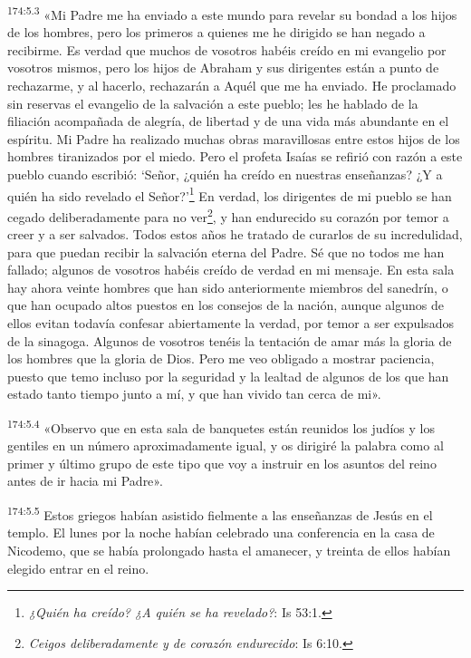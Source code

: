 \par
\textsuperscript{174:5.3} «Mi Padre me ha enviado a este mundo para revelar su bondad a los hijos de los hombres, pero los primeros a quienes me he dirigido se han negado a recibirme. Es verdad que muchos de vosotros habéis creído en mi evangelio por vosotros mismos, pero los hijos de Abraham y sus dirigentes están a punto de rechazarme, y al hacerlo, rechazarán a Aquél que me ha enviado. He proclamado sin reservas el evangelio de la salvación a este pueblo; les he hablado de la filiación acompañada de alegría, de libertad y de una vida más abundante en el espíritu. Mi Padre ha realizado muchas obras maravillosas entre estos hijos de los hombres tiranizados por el miedo. Pero el profeta Isaías se refirió con razón a este pueblo cuando escribió: `Señor, ¿quién ha creído en nuestras enseñanzas? ¿Y a quién ha sido revelado el Señor?'\footnote{\textit{¿Quién ha creído? ¿A quién se ha revelado?}: Is 53:1.} En verdad, los dirigentes de mi pueblo se han cegado deliberadamente para no ver\footnote{\textit{Ceigos deliberadamente y de corazón endurecido}: Is 6:10.}, y han endurecido su corazón por temor a creer y a ser salvados. Todos estos años he tratado de curarlos de su incredulidad, para que puedan recibir la salvación eterna del Padre. Sé que no todos me han fallado; algunos de vosotros habéis creído de verdad en mi mensaje. En esta sala hay ahora veinte hombres que han sido anteriormente miembros del sanedrín, o que han ocupado altos puestos en los consejos de la nación, aunque algunos de ellos evitan todavía confesar abiertamente la verdad, por temor a ser expulsados de la sinagoga. Algunos de vosotros tenéis la tentación de amar más la gloria de los hombres que la gloria de Dios. Pero me veo obligado a mostrar paciencia, puesto que temo incluso por la seguridad y la lealtad de algunos de los que han estado tanto tiempo junto a mí, y que han vivido tan cerca de mi».

\par
\textsuperscript{174:5.4} «Observo que en esta sala de banquetes están reunidos los judíos y los gentiles en un número aproximadamente igual, y os dirigiré la palabra como al primer y último grupo de este tipo que voy a instruir en los asuntos del reino antes de ir hacia mi Padre».

\par
\textsuperscript{174:5.5} Estos griegos habían asistido fielmente a las enseñanzas de Jesús en el templo. El lunes por la noche habían celebrado una conferencia en la casa de Nicodemo, que se había prolongado hasta el amanecer, y treinta de ellos habían elegido entrar en el reino.

